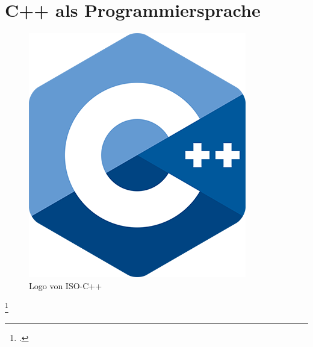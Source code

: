 \documentclass[titlepage, 11pt, a4paper, ngerman]{article}
\begin{document}
\newpage
\section{C++ als Programmiersprache}

\begin{figure}[ht]
    \centering
    \includegraphics[scale=0.3]{res/cpp_logo.png}
    \caption[Logo von ISO-C++]{Logo von ISO-C++\footnotemark}
    \label{fig:cpp-logo}
\end{figure}
\footcitetext{cpplogo}
\end{document}
